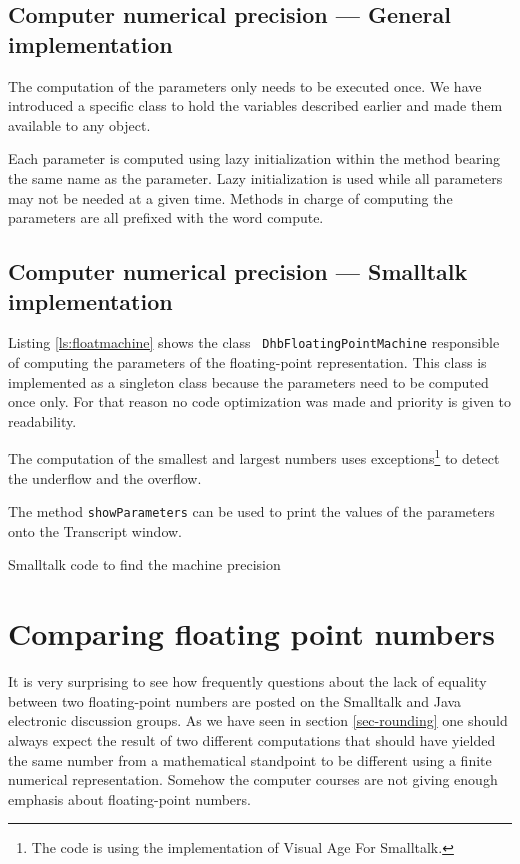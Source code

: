 \documentclass[twoside]{book}
\begin{document}
\subsection{Computer numerical precision --- General implementation}
The computation of the parameters only needs to be executed once.
We have introduced a specific class to hold the variables
described earlier and made them available to any object.

Each parameter is computed using lazy initialization within the
method bearing the same name as the parameter. Lazy initialization
is used while all parameters may not be needed at a given time.
Methods in charge of computing the parameters are all prefixed
with the word compute.

\subsection{Computer numerical precision --- Smalltalk implementation}
Listing \ref{ls:floatmachine} shows the class {\tt
DhbFloatingPointMachine} responsible of computing the parameters
of the floating-point representation. This class is implemented as
a singleton class because the parameters need to be computed once
only. For that reason no code optimization was made and priority
is given to readability.

\noindent The computation of the smallest and largest numbers uses
exceptions\footnote{The code is using the implementation of Visual
Age For Smalltalk\tm.} to detect the underflow and the overflow.

\noindent The method {\tt showParameters} can be used to print the
values of the parameters onto the Transcript window.

\begin{listing} Smalltalk code to find the machine precision
  \label{ls:floatmachine}
  
\end{listing}


\section{Comparing floating point numbers}
It is very surprising to see how frequently questions about the
lack of equality between two floating-point numbers are posted on
the Smalltalk and Java electronic discussion groups. As we have
seen in section \ref{sec-rounding} one should always expect the
result of two different computations that should have yielded the
same number from a mathematical standpoint to be different using a
finite  numerical representation. Somehow the computer courses are
not giving enough emphasis about floating-point numbers.
\end{document}
